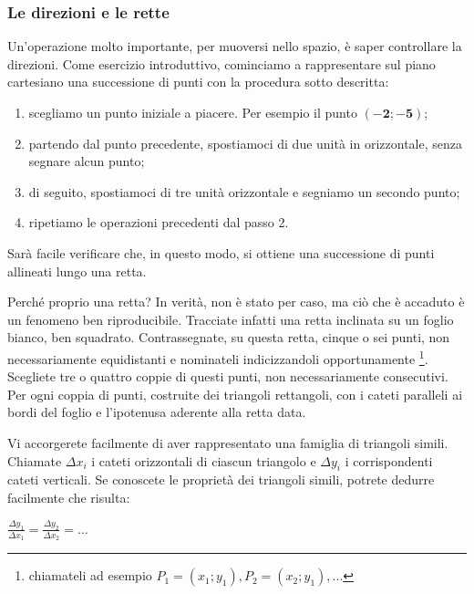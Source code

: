 \subsubsection*{Le direzioni e le rette}

Un'operazione molto importante, per muoversi nello spazio, è saper controllare la direzioni.\newline
Come esercizio introduttivo, cominciamo a rappresentare sul piano cartesiano una successione di punti con la procedura sotto descritta:
\begin{enumerate}
\item {scegliamo un punto iniziale a piacere. Per esempio il punto $\mathbf {(-2;-5)}$;}
\item {partendo dal punto precedente, spostiamoci di due unità in orizzontale, senza segnare alcun punto;}
\item {di seguito, spostiamoci di tre unità orizzontale e segniamo un secondo punto;}
\item {ripetiamo le operazioni precedenti dal passo 2.}
\end{enumerate}
Sarà facile verificare che, in questo modo, si ottiene una successione di punti allineati lungo una retta.\newline

Perché proprio una retta? In verità, non è stato per caso, ma ciò che è accaduto è un fenomeno ben riproducibile.\newline
Tracciate infatti una retta inclinata su un foglio bianco, ben squadrato.\newline
Contrassegnate, su questa retta, cinque o sei punti, non necessariamente equidistanti e nominateli indicizzandoli opportunamente \footnote{chiamateli ad esempio $P_1=(x_1;y_1),P_2=(x_2;y_1),...$ }.\newline
Scegliete tre o quattro coppie di questi punti, non necessariamente consecutivi.\newline
Per ogni coppia di punti, costruite dei triangoli rettangoli, con i cateti paralleli ai bordi del foglio e l'ipotenusa aderente alla retta data.

Vi accorgerete facilmente di aver rappresentato una famiglia di triangoli simili.\newline
Chiamate $\Delta x_i$ i cateti orizzontali di ciascun triangolo e $\Delta y_i$ i corrispondenti cateti verticali.
Se conoscete le proprietà dei triangoli simili, potrete dedurre facilmente che risulta:
\begin{center}
\begin{math}
\frac{\Delta y_1}{\Delta x_1} = \frac{\Delta y_2}{\Delta x_2} = ...
\end{math}
\end{center}

